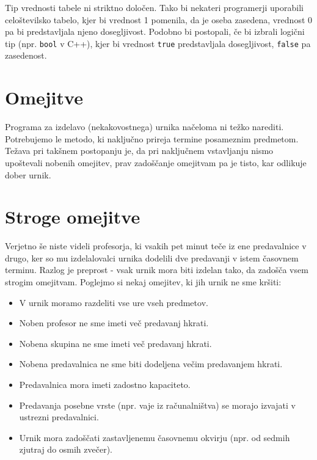 \documentclass[a4paper,10pt]{article}
\begin{document}
Tip vrednosti tabele ni striktno določen. Tako bi nekateri programerji uporabili
celoštevilsko tabelo, kjer bi vrednost 1 pomenila, da je oseba zasedena, vrednost 0
pa bi predstavljala njeno dosegljivost. Podobno bi postopali, če bi izbrali logični
tip (npr. \texttt{bool} v C++), kjer bi vrednost \texttt{true} predstavljala
dosegljivost, \texttt{false} pa zasedenost.

\section{Omejitve}

Programa za izdelavo (nekakovostnega) urnika načeloma ni težko narediti. Potrebujemo
le metodo, ki naključno prireja termine posameznim predmetom. Težava pri takšnem postopanju
je, da pri naključnem vstavljanju nismo upoštevali nobenih omejitev, prav zadoščanje omejitvam
pa je tisto, kar odlikuje dober urnik.

\section{Stroge omejitve}

Verjetno še niste videli profesorja, ki vsakih pet minut teče iz ene predavalnice v drugo,
ker so mu izdelalovalci urnika dodelili dve predavanji v istem časovnem terminu. Razlog
je preprost - vsak urnik mora biti izdelan tako, da zadošča vsem strogim omejitvam.
Poglejmo si nekaj omejitev, ki jih urnik ne sme kršiti:

\begin{itemize}
   \item V urnik moramo razdeliti vse ure vseh predmetov.
   \item Noben profesor ne sme imeti več predavanj hkrati.
   \item Nobena skupina ne sme imeti več predavanj hkrati.
   \item Nobena predavalnica ne sme biti dodeljena večim predavanjem hkrati.
   \item Predavalnica mora imeti zadostno kapaciteto.
   \item Predavanja posebne vrste (npr. vaje iz računalništva) se morajo izvajati v ustrezni predavalnici.
   \item Urnik mora zadoščati zastavljenemu časovnemu okvirju (npr. od sedmih zjutraj do osmih zvečer).
\end{itemize}
\end{document}
